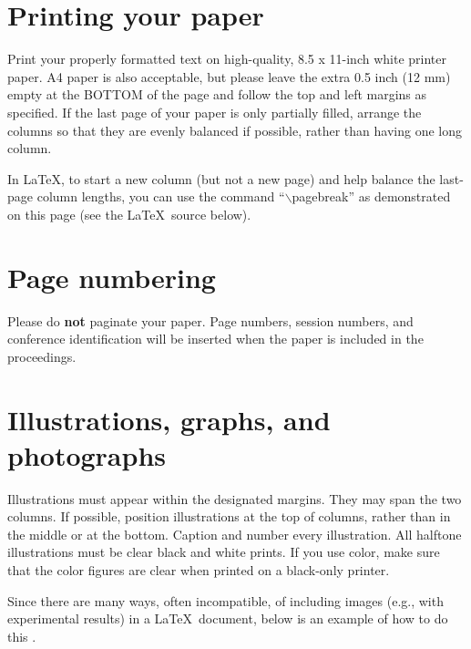 \documentclass{article}
\begin{document}
\section{Printing your paper}
\label{sec:print}

Print your properly formatted text on high-quality, 8.5 x 11-inch white printer
paper. A4 paper is also acceptable, but please leave the extra 0.5 inch (12 mm)
empty at the BOTTOM of the page and follow the top and left margins as
specified.  If the last page of your paper is only partially filled, arrange
the columns so that they are evenly balanced if possible, rather than having
one long column.

In \LaTeX, to start a new column (but not a new page) and help balance the
last-page column lengths, you can use the command ``$\backslash$pagebreak'' as
demonstrated on this page (see the \LaTeX\ source below).

\section{Page numbering}
\label{sec:page}

Please do {\bf not} paginate your paper.  Page numbers, session numbers, and
conference identification will be inserted when the paper is included in the
proceedings.

\section{Illustrations, graphs, and photographs}
\label{sec:illust}

Illustrations must appear within the designated margins.  They may span the two
columns.  If possible, position illustrations at the top of columns, rather
than in the middle or at the bottom.  Caption and number every illustration.
All halftone illustrations must be clear black and white prints.  If you use
color, make sure that the color figures are clear when printed on a black-only
printer.

Since there are many ways, often incompatible, of including images (e.g., with
experimental results) in a \LaTeX\ document, below is an example of how to do
this \cite{Lamp86}.
\end{document}
